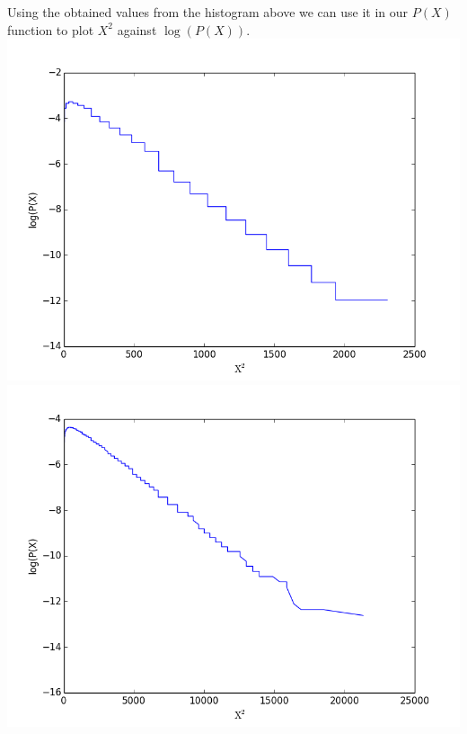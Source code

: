 \documentclass{article}
\begin{document}
\begin{enumerate}[I]
\begin{center}
\end{center}
Using the obtained values from the histogram above we can use it in our $P(X)$ function to plot $X^2$ against $\log(P(X))$. \\
\includegraphics[scale=0.3]{lastone.png}  
\includegraphics[scale=0.3]{lastone1.png}  




\end{enumerate}
\end{document}
